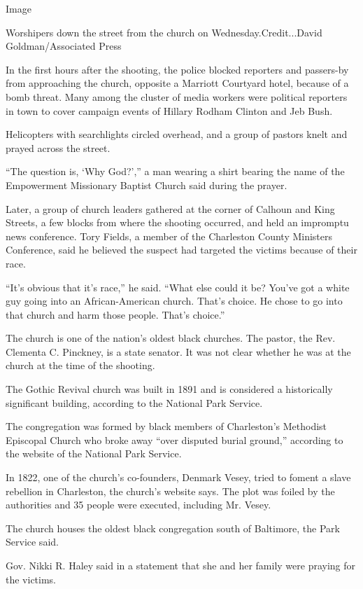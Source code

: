 Image

Worshipers down the street from the church on Wednesday.Credit...David
Goldman/Associated Press

In the first hours after the shooting, the police blocked reporters and
passers-by from approaching the church, opposite a Marriott Courtyard
hotel, because of a bomb threat. Many among the cluster of media workers
were political reporters in town to cover campaign events of Hillary
Rodham Clinton and Jeb Bush.

Helicopters with searchlights circled overhead, and a group of pastors
knelt and prayed across the street.

``The question is, `Why God?','' a man wearing a shirt bearing the name
of the Empowerment Missionary Baptist Church said during the prayer.

Later, a group of church leaders gathered at the corner of Calhoun and
King Streets, a few blocks from where the shooting occurred, and held an
impromptu news conference. Tory Fields, a member of the Charleston
County Ministers Conference, said he believed the suspect had targeted
the victims because of their race.

``It's obvious that it's race,'' he said. ``What else could it be?
You've got a white guy going into an African-American church. That's
choice. He chose to go into that church and harm those people. That's
choice.''

The church is one of the nation's oldest black churches. The pastor, the
Rev. Clementa C. Pinckney, is a state senator. It was not clear whether
he was at the church at the time of the shooting.

The Gothic Revival church was built in 1891 and is considered a
historically significant building, according to the National Park
Service.

The congregation was formed by black members of Charleston's Methodist
Episcopal Church who broke away ``over disputed burial ground,''
according to the website of the National Park Service.

In 1822, one of the church's co-founders, Denmark Vesey, tried to foment
a slave rebellion in Charleston, the church's website says. The plot was
foiled by the authorities and 35 people were executed, including Mr.
Vesey.

The church houses the oldest black congregation south of Baltimore, the
Park Service said.

Gov. Nikki R. Haley said in a statement that she and her family were
praying for the victims.


